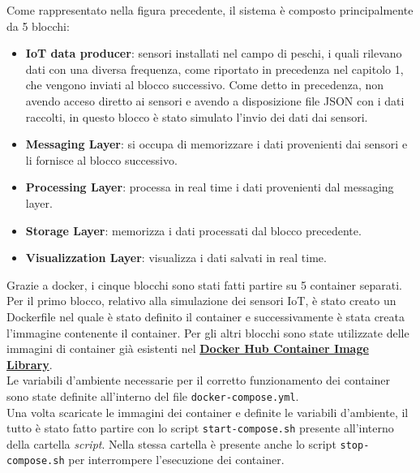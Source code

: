 \documentclass{article}
\begin{document}
\bigskip
\noindent
Come rappresentato nella figura precedente, il sistema è composto principalmente da 5 blocchi:
\begin{itemize}[noitemsep]
  \item \textbf{IoT data producer}: sensori installati nel campo di peschi, i quali rilevano dati con una diversa frequenza, come riportato in precedenza nel capitolo 1, che vengono inviati al blocco successivo. Come detto in precedenza, non avendo acceso diretto ai sensori e avendo a disposizione file JSON con i dati raccolti, in questo blocco è stato simulato l'invio dei dati dai sensori.
  \item \textbf{Messaging Layer}: si occupa di memorizzare i dati provenienti dai sensori e li fornisce al blocco successivo.
  \item \textbf{Processing Layer}: processa in real time i dati provenienti dal messaging layer.
  \item \textbf{Storage Layer}: memorizza i dati processati dal blocco precedente.
  \item \textbf{Visualizzation Layer}: visualizza i dati salvati in real time.
\end{itemize}
Grazie a docker, i cinque blocchi sono stati fatti partire su 5 container separati. \\
Per il primo blocco, relativo alla simulazione dei sensori IoT, è stato creato un Dockerfile nel quale è stato definito il container e successivamente è stata creata l'immagine contenente il container. Per gli altri blocchi sono state utilizzate delle immagini di container già esistenti nel \href{https://hub.docker.com} {\textbf{Docker Hub Container Image Library}}.\\
Le variabili d'ambiente necessarie per il corretto funzionamento dei container sono state definite all'interno del file \texttt{docker-compose.yml}.\\
Una volta scaricate le immagini dei container e definite le variabili d'ambiente, il tutto è stato fatto partire con lo script \texttt{start-compose.sh} presente all'interno della cartella \textit{script}. Nella stessa cartella è presente anche lo script \texttt{stop-compose.sh} per interrompere l'esecuzione dei container.
\end{document}
